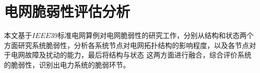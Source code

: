 





\section{电网脆弱性评估分析}
\label{sec:singleAssessment}

本文基于$IEEE39$标准电网算例对电网脆弱性的研究工作，分别从结构和状态两个方面研究系统脆弱性，分析各系统节点对电网拓扑结构的影响程度，以及各节点对于电网故障及扰动的能力，最后将结构与状态
这两方面进行融合，综合评价系统的脆弱性，识别出电力系统的脆弱环节。

